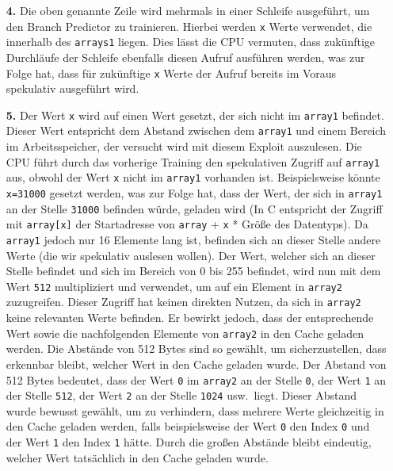 \begin{itemize}
	\item[\textbf{4.}]\label{itm:spectre_step4} Die oben genannte Zeile wird mehrmals in einer Schleife ausgeführt, um den Branch Predictor zu trainieren.
	      Hierbei werden \texttt{x} Werte verwendet, die innerhalb des \texttt{arrays1} liegen.
	      Dies lässt die CPU vermuten, dass zukünftige Durchläufe der Schleife ebenfalls diesen Aufruf ausführen werden, was zur Folge hat, dass für zukünftige \texttt{x} Werte der Aufruf bereits im Voraus spekulativ ausgeführt wird.
	\item[\textbf{5.}] Der Wert \texttt{x} wird auf einen Wert gesetzt, der sich nicht im \texttt{array1} befindet.
	      Dieser Wert entspricht dem Abstand zwischen dem \texttt{array1} und einem Bereich im Arbeitsspeicher, der versucht wird mit diesem Exploit auszulesen.
	      Die CPU führt durch das vorherige Training den spekulativen Zugriff auf \texttt{array1} aus, obwohl der Wert \texttt{x} nicht im \texttt{array1} vorhanden ist.
	      Beispielsweise könnte \texttt{x=31000} gesetzt werden, was zur Folge hat, dass der Wert, der sich in \texttt{array1} an der Stelle \texttt{31000} befinden würde, geladen wird (In C entspricht der Zugriff mit \texttt{array[x]} der Startadresse von \texttt{array} + \texttt{x} * Größe des Datentyps).
	      Da \texttt{array1} jedoch nur 16 Elemente lang ist, befinden sich an dieser Stelle andere Werte (die wir spekulativ auslesen wollen).
	      Der Wert, welcher sich an dieser Stelle befindet und sich im Bereich von 0 bis 255 befindet, wird nun mit dem Wert \texttt{512} multipliziert und verwendet, um auf ein Element in \texttt{array2} zuzugreifen.
	      Dieser Zugriff hat keinen direkten Nutzen, da sich in \texttt{array2} keine relevanten Werte befinden.
	      Er bewirkt jedoch, dass der entsprechende Wert sowie die nachfolgenden Elemente von \texttt{array2} in den Cache geladen werden.
	      Die Abstände von 512 Bytes sind so gewählt, um sicherzustellen, dass erkennbar bleibt, welcher Wert in den Cache geladen wurde.
	      Der Abstand von 512 Bytes bedeutet, dass der Wert \texttt{0} im \texttt{array2} an der Stelle \texttt{0}, der Wert \texttt{1} an der Stelle \texttt{512}, der Wert \texttt{2} an der Stelle \texttt{1024} usw.~liegt.
	      Dieser Abstand wurde bewusst gewählt, um zu verhindern, dass mehrere Werte gleichzeitig in den Cache geladen werden, falls beispielsweise der Wert \texttt{0} den Index \texttt{0} und der Wert \texttt{1} den Index \texttt{1} hätte.
	      Durch die großen Abstände bleibt eindeutig, welcher Wert tatsächlich in den Cache geladen wurde.

\end{itemize}
